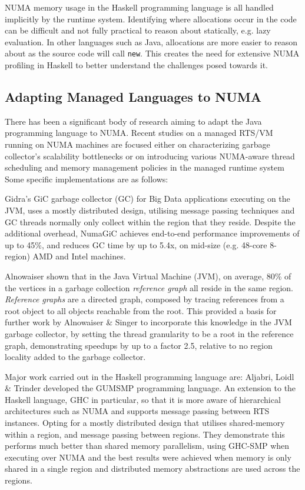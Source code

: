 \documentclass{paper}\usepackage{graphicx}
\begin{document}
NUMA memory usage in the Haskell programming language is all handled implicitly by the runtime system. Identifying where allocations occur in the code can be difficult and not fully practical to reason about statically, e.g. lazy evaluation. In other languages such as Java, allocations are more easier to reason about as the source code will call \lstinline{new}. This creates the need for extensive NUMA profiling in Haskell to better understand the challenges posed towards it.

\subsection{Adapting Managed Languages to NUMA}
\label{sec:managed}

There has been a significant body of research aiming to adapt the Java programming language to NUMA. Recent studies on a managed RTS/VM running on NUMA machines are focused either on characterizing garbage collector’s scalability bottlenecks or on introducing various NUMA-aware thread
scheduling and memory management policies in the managed runtime system  Some specific implementations are as follows:

Gidra's GiC garbage collector (GC) \cite{DBLP:conf/asplos/Gidra0SSN15} for Big Data applications executing on the JVM, uses a mostly distributed design, utilising message passing techniques and GC threads normally only collect within the region that they reside. Despite the additional overhead, NumaGiC achieves end-to-end performance improvements of up to 45\%, and reduces GC time by up to 5.4x, on mid-size (e.g. 48-core 8-
region) AMD and Intel machines.

Alnowaiser shown that in the Java Virtual Machine (JVM), on average, 80\% of the vertices in a garbage collection \textit{reference graph} all reside in the same region\cite{DBLP:conf/pldi/Alnowaiser14}. \textit{Reference graphs} are a directed graph, composed by tracing references from a root object to all objects reachable from the root. This provided a basis for further work by Alnowaiser \& Singer to incorporate this knowledge in the JVM garbage collector\cite{DBLP:conf/lcpc/AlnowaiserS15}, by setting the thread granularity to be a root in the reference graph, demonstrating speedups by up to a factor 2.5, relative to no region locality added to the garbage collector.

Major work carried out in the Haskell programming language are:
Aljabri, Loidl \& Trinder developed the GUMSMP programming language\cite{DBLP:phd/ethos/Aljabri15,DBLP:conf/sfp/AljabriLT14}. An extension to the Haskell language, GHC in particular, so that it is more aware of hierarchical architectures such as NUMA and supports message passing between RTS instances. Opting for a mostly distributed design that utilises shared-memory within
a region, and message passing between regions. They demonstrate this performs much better than shared memory parallelism, using GHC-SMP when executing over NUMA and the best results were achieved when memory is only shared in a single region and distributed memory abstractions are used across the regions.
\end{document}
